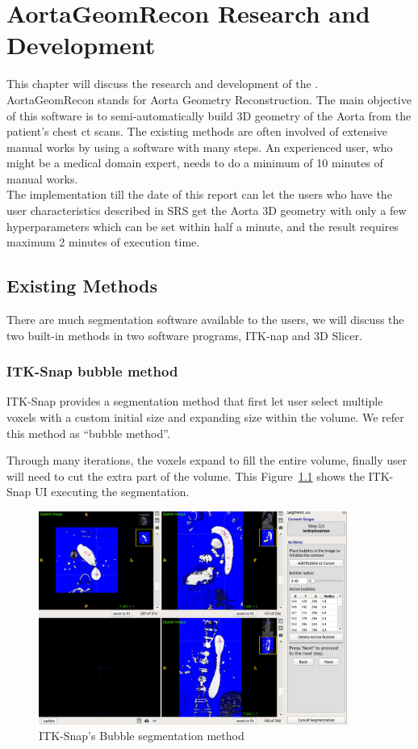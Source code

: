 \chapter{AortaGeomRecon Research and Development}
This chapter will discuss the research and development of the \progname{}.\\
AortaGeomRecon stands for Aorta Geometry Reconstruction. The main objective of this software is to semi-automatically build 3D geometry of the Aorta from the patient's chest ct scans.  The existing methods are often involved of extensive manual works by using a software with many steps. An experienced user, who might be a medical domain expert, needs to do a minimum of 10 minutes of manual works. \\
The implementation till the date of this report can let the users who have the user characteristics described in SRS \citep{SRS} get the Aorta 3D geometry with only a few hyperparameters which can be set within half a minute, and the result requires maximum 2 minutes of execution time. \\


\section{Existing Methods}
There are much segmentation software available to the users, we will discuss the two built-in methods in two software programs, ITK-nap and 3D Slicer.

\subsection{ITK-Snap bubble method} 
\indent
ITK-Snap provides a segmentation method that first let user select multiple voxels with a custom initial size and expanding size within the volume. We refer this method as ``bubble method''.

Through many iterations, the voxels expand to fill the entire volume, finally user will need to cut the extra part of the volume. This Figure~\ref{fig_ITK} shows the ITK-Snap UI executing the segmentation.

\begin{figure}[ht]
    \centering
    \includegraphics[width=0.9\textwidth]{figures/AGR/bubbles.png}
    \caption[ITK-Snap's Bubble segmentation UI]{ITK-Snap's Bubble segmentation method}
    \label{fig_ITK}
\end{figure}

